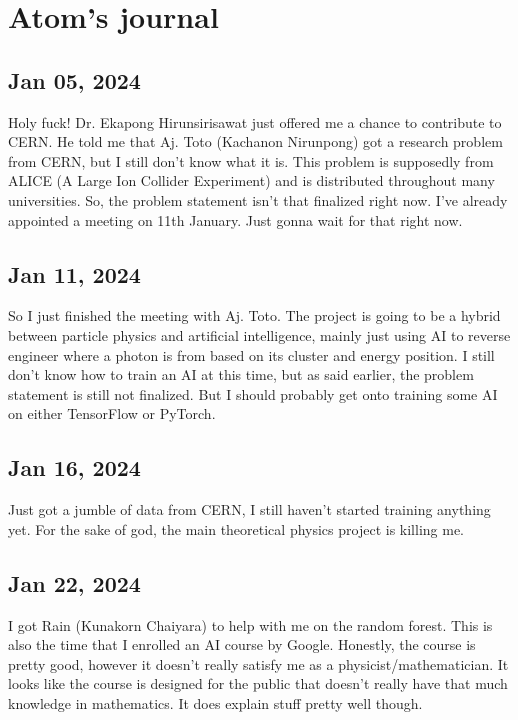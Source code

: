 \chapter{Atom's journal}

\section{Jan 05, 2024}

Holy fuck! Dr. Ekapong Hirunsirisawat just offered me a chance to contribute to CERN. He told me that Aj. Toto (Kachanon Nirunpong) got a research problem from CERN, but I still don't know what it is. This problem is supposedly from ALICE (A Large Ion Collider Experiment) and is distributed throughout many universities. So, the problem statement isn't that finalized right now. I've already appointed a meeting on 11th January. Just gonna wait for that right now.

\section{Jan 11, 2024}

So I just finished the meeting with Aj. Toto. The project is going to be a hybrid between particle physics and artificial intelligence, mainly just using AI to reverse engineer where a photon is from based on its cluster and energy position. I still don't know how to train an AI at this time, but as said earlier, the problem statement is still not finalized. But I should probably get onto training some AI on either TensorFlow or PyTorch.

\section{Jan 16, 2024}

Just got a jumble of data from CERN, I still haven't started training anything yet. For the sake of god, the main theoretical physics project is killing me.

\section{Jan 22, 2024}

I got Rain (Kunakorn Chaiyara) to help with me on the random forest. This is also the time that I enrolled an AI course by Google. Honestly, the course is pretty good, however it doesn't really satisfy me as a physicist/mathematician. It looks like the course is designed for the public that doesn't really have that much knowledge in mathematics. It does explain stuff pretty well though.


